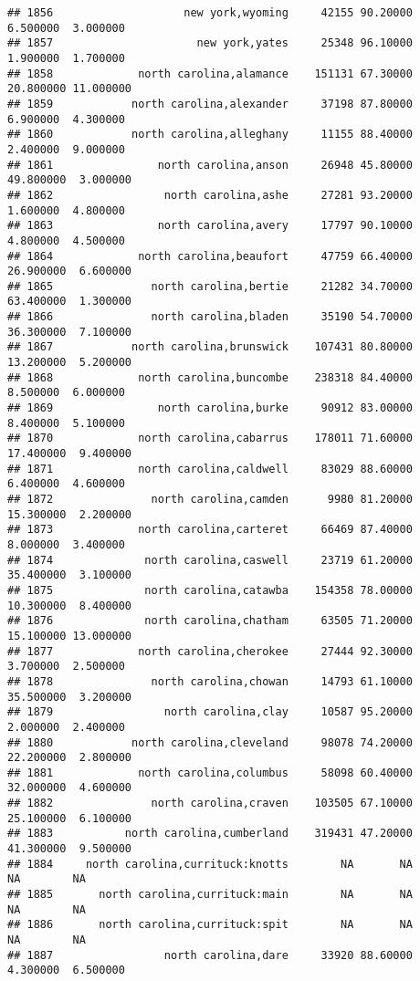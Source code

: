 \documentclass[
]{article}
\begin{document}
\begin{verbatim}
## 1856                    new york,wyoming     42155 90.20000  6.500000  3.000000
## 1857                      new york,yates     25348 96.10000  1.900000  1.700000
## 1858             north carolina,alamance    151131 67.30000 20.800000 11.000000
## 1859            north carolina,alexander     37198 87.80000  6.900000  4.300000
## 1860            north carolina,alleghany     11155 88.40000  2.400000  9.000000
## 1861                north carolina,anson     26948 45.80000 49.800000  3.000000
## 1862                 north carolina,ashe     27281 93.20000  1.600000  4.800000
## 1863                north carolina,avery     17797 90.10000  4.800000  4.500000
## 1864             north carolina,beaufort     47759 66.40000 26.900000  6.600000
## 1865               north carolina,bertie     21282 34.70000 63.400000  1.300000
## 1866               north carolina,bladen     35190 54.70000 36.300000  7.100000
## 1867            north carolina,brunswick    107431 80.80000 13.200000  5.200000
## 1868             north carolina,buncombe    238318 84.40000  8.500000  6.000000
## 1869                north carolina,burke     90912 83.00000  8.400000  5.100000
## 1870             north carolina,cabarrus    178011 71.60000 17.400000  9.400000
## 1871             north carolina,caldwell     83029 88.60000  6.400000  4.600000
## 1872               north carolina,camden      9980 81.20000 15.300000  2.200000
## 1873             north carolina,carteret     66469 87.40000  8.000000  3.400000
## 1874              north carolina,caswell     23719 61.20000 35.400000  3.100000
## 1875              north carolina,catawba    154358 78.00000 10.300000  8.400000
## 1876              north carolina,chatham     63505 71.20000 15.100000 13.000000
## 1877             north carolina,cherokee     27444 92.30000  3.700000  2.500000
## 1878               north carolina,chowan     14793 61.10000 35.500000  3.200000
## 1879                 north carolina,clay     10587 95.20000  2.000000  2.400000
## 1880            north carolina,cleveland     98078 74.20000 22.200000  2.800000
## 1881             north carolina,columbus     58098 60.40000 32.000000  4.600000
## 1882               north carolina,craven    103505 67.10000 25.100000  6.100000
## 1883           north carolina,cumberland    319431 47.20000 41.300000  9.500000
## 1884     north carolina,currituck:knotts        NA       NA        NA        NA
## 1885       north carolina,currituck:main        NA       NA        NA        NA
## 1886       north carolina,currituck:spit        NA       NA        NA        NA
## 1887                 north carolina,dare     33920 88.60000  4.300000  6.500000

\end{verbatim}
\end{document}
